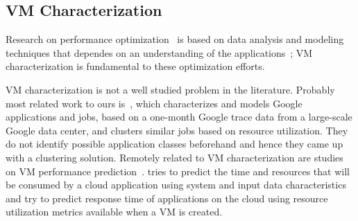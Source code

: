 \subsection{VM Characterization}


Research on performance optimization~\cite{Yang2005,Matsunaga2010,OguraM10} is based on data analysis and modeling techniques that dependes on an understanding of the applications~\cite{Shan2008}; VM characterization is fundamental to these optimization efforts. 

VM characterization is not a well studied problem in the literature. Probably most related work to ours is~\cite{Derrick2014}, which characterizes and models Google applications and jobs, based on a one-month Google trace data from a large-scale Google data center, and clusters similar jobs based on resource utilization. They do not identify possible application classes beforehand and hence they came up with a clustering solution. Remotely related to VM characterization are studies on VM performance prediction~\cite{Matsunaga2010, Samuel2013}. \cite{Matsunaga2010} tries to predict the time and resources that will be consumed by a cloud application using system and input data characteristics and \cite{Samuel2013} try to predict response time of applications on the cloud using resource utilization metrics available when a VM is created.

